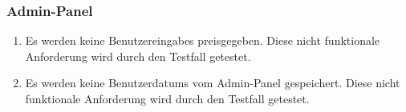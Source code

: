 \subsubsection*{Admin-Panel}

\begin{samepage}
    \begin{enumerate}[label=\textbf{/NFD\arabic*0/}, align=left, start=3]
        \item \label{/NFD30/} Es werden keine \Glspl{Benutzereingabe} preisgegeben. Diese nicht funktionale Anforderung wird durch den Testfall  getestet.
        \item \label{/NFD40/} Es werden keine \Glspl{Benutzerdatum} vom \Gls{Admin-Panel} gespeichert. Diese nicht funktionale Anforderung wird durch den Testfall  getestet.
    \end{enumerate}
\end{samepage}
